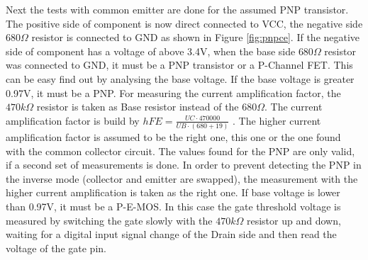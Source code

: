 Next the tests with common emitter are done for the assumed PNP transistor.
The positive side of component is now direct connected to VCC, the negative side \(680\Omega\) resistor
is connected to GND as shown in Figure \ref{fig:pnpce}. 
If the negative side of component has a voltage of above 3.4V, when the base side \(680\Omega\) resistor 
was connected to GND, it must be a PNP transistor or a P-Channel FET. This can be easy find out by
analysing the base voltage. If the base voltage is greater 0.97V, it must be a PNP.
For measuring the current amplification factor, the \(470k\Omega\) resistor is taken as Base resistor
instead of the \(680\Omega\).
The current amplification factor is build by \(hFE = \frac{UC \cdot 470000}{UB \cdot (680+19)}\) .
The higher current amplification factor is assumed to be the right one, this one or the one found with
the common collector circuit.
The values found for the PNP are only valid, if a second
set of measurements is done. In order to prevent detecting the PNP in the inverse mode
(collector and emitter are swapped), the measurement with the higher current amplification is taken as
the right one.
If base voltage is lower than 0.97V, it must be a P-E-MOS. In this case the gate threshold voltage is measured
by switching the gate slowly with the \(470k\Omega\) resistor up and down, waiting for a digital
input signal change of the Drain side and then read the voltage of the gate pin.
